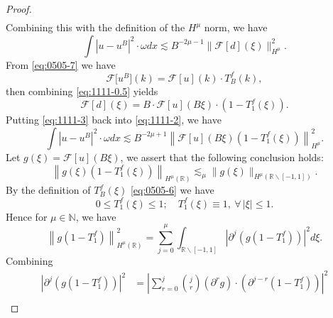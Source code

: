 \documentclass[10pt,a4paper]{amsart}
\begin{document}
\begin{proof}
\begin{equation}
\begin{aligned}
    \end{aligned}
  \end{equation}
  Combining this with the definition of the $H^\mu$ norm, we have
  \begin{equation}\label{eq:1111-2}
    \int\left|u-u^B\right|^2 \cdot \omega d x \lesssim B^{-2 \mu-1}\bigl\|\mathcal{F}[d](\xi)\bigr\|_{H^\mu}^2.
  \end{equation}
  From \eqref{eq:0505-7} we have
  \begin{equation}\label{eq:0505-22}
    \mathcal{F}\bigl[u^B\bigr](k)=\mathcal{F}[u](k) \cdot T_B^f(k),
  \end{equation}
  then combining \eqref{eq:1111-0.5} yields
  \begin{equation}\label{eq:1111-3}
    \mathcal{F}[d](\xi)=B \cdot \mathcal{F}[u](B \xi) \cdot \left(1-T_1^f(\xi)\right).
  \end{equation}
  Putting \eqref{eq:1111-3} back into \eqref{eq:1111-2}, we have
  \begin{equation}\label{eq:1111-4}
    \int \left|u-u^B\right|^2 \cdot \omega d x \lesssim B^{-2 \mu+1} \left\| \mathcal{F}[u](B \xi)\left(1-T_1^f(\xi)\right)\right\|_{H^\mu}^2.
  \end{equation}
  Let $g(\xi) = \mathcal{F}[u](B\xi)$, we assert that the following conclusion holds:
  \begin{equation}\label{eq:1111-5}
    \left\|g(\xi)\left(1-T_1^f(\xi)\right)\right\|_{H^\mu(\mathbb{R})} \lesssim_\mu \bigl\|g(\xi)\bigr\|_{H^{\mu}\left(\mathbb{R}\backslash [-1,1]\right)}.
  \end{equation}
  By the definition of $T_B^f(\xi)$ \eqref{eq:0505-6} we have
  \begin{equation}\label{eq:0505-23}
    0 \leqslant T_1^f(\xi) \leqslant 1; \quad T_1^f(\xi) \equiv 1,\ \forall\,|\xi| \leqslant 1.
  \end{equation}
  Hence for $\mu \in \mathbb{N}$, we have
  \begin{equation}\label{eq:1111-6}
    \left\|g\left(1-T_1^f\right)\right\|_{H^\mu(\mathbb{R})}^2=\sum_{j=0}^\mu \int_{\mathbb{R} \backslash[-1,1]}\left|\partial^j\left(g\left(1-T_1^f\right)\right)\right|^2 d \xi.
  \end{equation}
  Combining
  \begin{equation}\label{eq:1111-7}
    \begin{aligned}
    \left|\partial^j\left(g\left(1-T_1^f\right)\right)\right|^2 & =\left|\sum_{r=0}^j\binom{j}{r}\left(\partial^r g\right) \cdot\left(\partial^{j-r}\left(1-T_1^f\right)\right)\right|^2 \\

\end{aligned}
\end{equation}
\end{proof}
\end{document}
